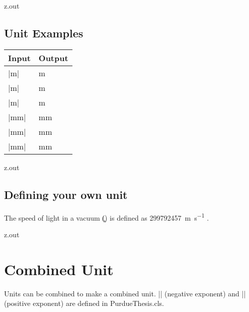 \begin{VerbatimOut}{z.out}

\subsection{Unit Examples}

\begin{inlinetable}
  \begin{tabular}{@{}ll@{}}
    \toprule
    \textbf{Input}& \textbf{Output}\\
    \midrule
    |\unit{\meter}|&       \unit{\meter}\\
    |\unit{\m}|&           \unit{\m}\\
    |\unit{m}|&            \unit{m}\\[6pt]
    |\unit{\milli\meter}|& \unit{\milli\meter}\\
    |\unit{\mm}|&          \unit{\mm}\\
    |\unit{mm}|&           \unit{mm}\\
    \bottomrule
  \end{tabular}
\end{inlinetable}
\end{VerbatimOut}

\MyIO


\begin{VerbatimOut}{z.out}
  
\subsection{Defining your own unit}

The speed of light in a vacuum (\unit{\c}) is defined as \qty{299792457}{m\per s}
\cite{wikipedia-speed-of-light}.
\end{VerbatimOut}

\MyIO


\begin{VerbatimOut}{z.out}


\section{Combined Unit}

Units can be combined to make a combined unit.
|\NE| (negative exponent)
and |\PE| (positive exponent)
are defined in PurdueThesis.cls.
\end{VerbatimOut}

\MyIO


